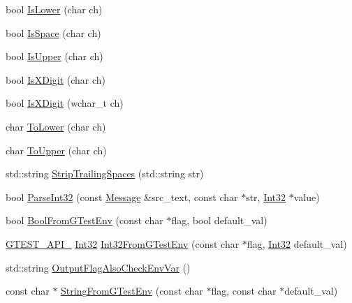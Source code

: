 \begin{DoxyCompactItemize}
bool \mbox{\hyperlink{namespacetesting_1_1internal_ac26ce3883bc8919c27074975e958f3b7}{Is\+Lower}} (char ch)
\item 
bool \mbox{\hyperlink{namespacetesting_1_1internal_af429e04f70f9c10f6aa76a5d1ccd389f}{Is\+Space}} (char ch)
\item 
bool \mbox{\hyperlink{namespacetesting_1_1internal_a84f3baa379fec6bf5947cb5165aa8cc9}{Is\+Upper}} (char ch)
\item 
bool \mbox{\hyperlink{namespacetesting_1_1internal_aa234ef141278263fb143b616c74c86e7}{Is\+X\+Digit}} (char ch)
\item 
bool \mbox{\hyperlink{namespacetesting_1_1internal_a6ab68a30f8291c09b2289c132bbe3b16}{Is\+X\+Digit}} (wchar\+\_\+t ch)
\item 
char \mbox{\hyperlink{namespacetesting_1_1internal_ad9c627ef2a94245e3fd69e7ab3d49b42}{To\+Lower}} (char ch)
\item 
char \mbox{\hyperlink{namespacetesting_1_1internal_ac1b876a8133895bd553d4780ecaa1e3a}{To\+Upper}} (char ch)
\item 
std\+::string \mbox{\hyperlink{namespacetesting_1_1internal_aa6afda12e567c353e2e9b9c2e8cae14f}{Strip\+Trailing\+Spaces}} (std\+::string str)
\item 
bool \mbox{\hyperlink{namespacetesting_1_1internal_ac06fc81336a3d80755f4020d34321766}{Parse\+Int32}} (const \mbox{\hyperlink{classtesting_1_1Message}{Message}} \&src\+\_\+text, const char $\ast$str, \mbox{\hyperlink{namespacetesting_1_1internal_a8ee38faaf875f133358abaf9bc056cec}{Int32}} $\ast$value)
\item 
bool \mbox{\hyperlink{namespacetesting_1_1internal_a67132cdce23fb71b6c38ee34ef81eb4c}{Bool\+From\+G\+Test\+Env}} (const char $\ast$flag, bool default\+\_\+val)
\item 
\mbox{\hyperlink{gtest-port_8h_aa73be6f0ba4a7456180a94904ce17790}{G\+T\+E\+S\+T\+\_\+\+A\+P\+I\+\_\+}} \mbox{\hyperlink{namespacetesting_1_1internal_a8ee38faaf875f133358abaf9bc056cec}{Int32}} \mbox{\hyperlink{namespacetesting_1_1internal_a0f7e728793f9e6cb0aa2b69eaa468bf3}{Int32\+From\+G\+Test\+Env}} (const char $\ast$flag, \mbox{\hyperlink{namespacetesting_1_1internal_a8ee38faaf875f133358abaf9bc056cec}{Int32}} default\+\_\+val)
\item 
std\+::string \mbox{\hyperlink{namespacetesting_1_1internal_a0c793c6d84760d900299916c077a1af4}{Output\+Flag\+Also\+Check\+Env\+Var}} ()
\item 
const char $\ast$ \mbox{\hyperlink{namespacetesting_1_1internal_a7ed785df46a339403b0f749d3a879201}{String\+From\+G\+Test\+Env}} (const char $\ast$flag, const char $\ast$default\+\_\+val)

\end{DoxyCompactItemize}
